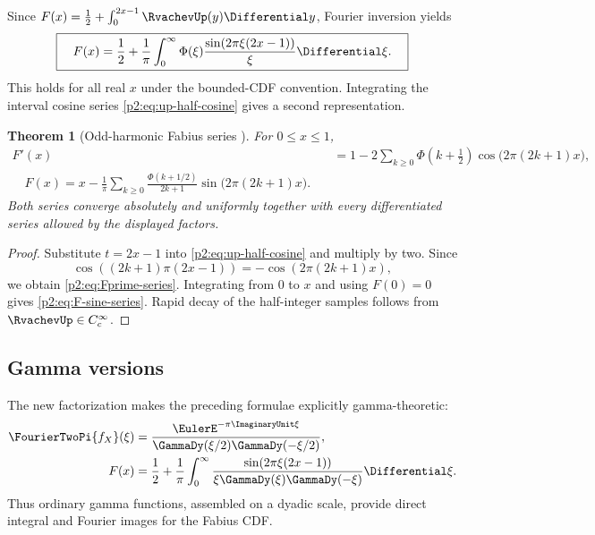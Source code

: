 \documentclass[11pt]{article}
\newtheorem{theorem}{Theorem}[section]
\theoremstyle{definition}
\theoremstyle{remark}
\begin{document}
Since $F(x)=\tfrac12+\int_0^{2x-1}\RvachevUp(y)\Differential y$, Fourier inversion yields
\begin{equation}
 \boxed{\quad
 F(x)=\frac12+\frac1\pi\int_0^\infty
 \Phi(\xi)\frac{\sin(2\pi\xi(2x-1))}{\xi}\Differential\xi.
 \quad}                                                  \label{p2:eq:F-sine-integral}
\end{equation}
This holds for all real $x$ under the bounded-CDF convention.  Integrating the interval
cosine series \eqref{p2:eq:up-half-cosine} gives a second representation.

\begin{theorem}[Odd-harmonic Fabius series \New]
For $0\le x\le1$,
{\small
\begin{align}
 F'(x)
 &=1-2\sum_{k\ge0}\Phi\left(k+\frac12\right)
 \cos\bigl(2\pi(2k+1)x\bigr),                            \label{p2:eq:Fprime-series}\\
 \boxed{\quad
 F(x)=x-\frac1\pi\sum_{k\ge0}
 \frac{\Phi(k+1/2)}{2k+1}
 \sin\bigl(2\pi(2k+1)x\bigr).
 \quad}                                                  \label{p2:eq:F-sine-series}
\end{align}
}
Both series converge absolutely and uniformly together with every differentiated series
allowed by the displayed factors.
\end{theorem}

\begin{proof}
Substitute $t=2x-1$ into \eqref{p2:eq:up-half-cosine} and multiply by two.  Since
\[
 \cos((2k+1)\pi(2x-1))=-\cos(2\pi(2k+1)x),
\]
we obtain \eqref{p2:eq:Fprime-series}.  Integrating from $0$ to $x$ and using $F(0)=0$ gives
\eqref{p2:eq:F-sine-series}.  Rapid decay of the half-integer samples follows from
$\RvachevUp\in C_c^\infty$.
\end{proof}

\subsection{Gamma versions}

The new factorization makes the preceding formulae explicitly gamma-theoretic:
\begin{align}
 \FourierTwoPi{f_X}(\xi)
 &=\frac{\EulerE^{-\pi\ImaginaryUnit\xi}}
 {\GammaDy(\xi/2)\GammaDy(-\xi/2)},                       \label{p2:eq:fX-gamma}\\
 F(x)
 &=\frac12+\frac1\pi\int_0^\infty
 \frac{\sin(2\pi\xi(2x-1))}
 {\xi\GammaDy(\xi)\GammaDy(-\xi)}\Differential\xi.              \label{p2:eq:F-gamma-again}
\end{align}
Thus ordinary gamma functions, assembled on a dyadic scale, provide direct integral and
Fourier images for the Fabius CDF.
\end{document}
